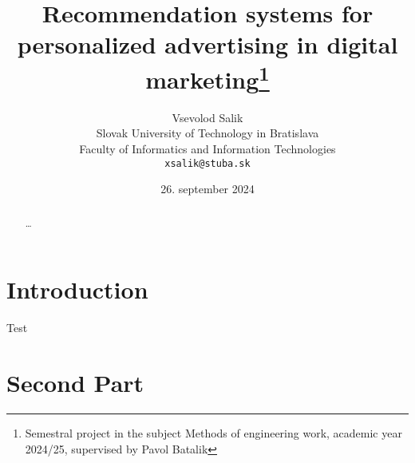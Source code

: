 \documentclass[10pt,twoside,english,a4paper]{article}
\title{Recommendation systems for personalized advertising in digital marketing\thanks{Semestral project in the subject Methods of engineering work, academic year 2024/25, supervised by Pavol Batalik}} %
\author{Vsevolod Salik\\[2pt]
	{\small Slovak University of Technology in Bratislava }\\
	{\small Faculty of Informatics and Information Technologies }\\
	{\small \texttt{xsalik@stuba.sk}}
	}
\date{\small 26. september 2024} %
\begin{document}
\maketitle

\begin{abstract}
\ldots
\end{abstract}



\section{Introduction}
Test




\section{Second Part}



% 
\end{document}
